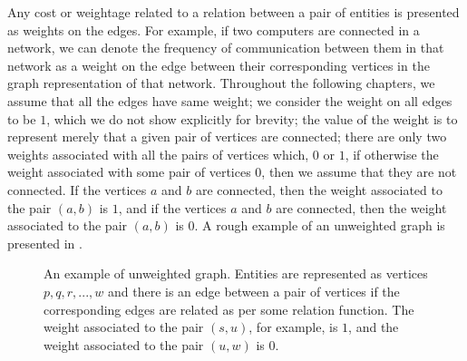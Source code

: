 Any cost or weightage related to a relation between a pair of entities is presented as weights on the edges. For example, if two computers are connected in a network, we can denote the frequency of communication between them in that network as a weight on the edge between their corresponding vertices in the graph representation of that network. Throughout the following chapters, we assume that all the edges have same weight; we consider the weight on all edges to be $1$, which we do not show explicitly for brevity; the value of the weight is to represent merely that a given pair of vertices are connected; there are only two weights associated with all the pairs of vertices which, $0$ or $1$, if otherwise the weight associated with some pair of vertices $0$, then we assume that they are not connected. If the vertices $a$ and $b$ are connected, then the weight associated to the pair $(a,b)$ is $1$, and if the vertices $a$ and $b$ are connected, then the weight associated to the pair $(a,b)$ is $0$. A rough example of an unweighted graph is presented in .

\begin{figure}
    \begin{minipage}{1\textwidth}
        \centering
    \end{minipage}
    \caption{An example of unweighted graph. Entities are represented as vertices $p, q, r, . . ., w$ and there is an edge between a pair of vertices if the corresponding edges are related as per some relation function. The weight associated to the pair $(s,u)$, for example, is $1$, and the weight associated to the pair $(u,w)$ is $0$.}
    \label{figure:unweighted-graph}
\end{figure}

